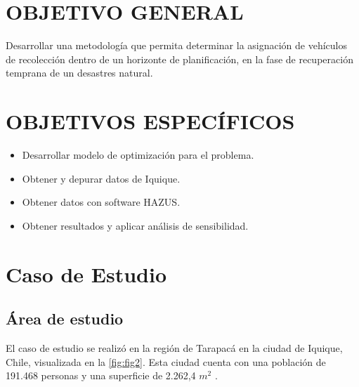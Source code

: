 \documentclass[12pt,a4paper]{article}
\begin{document}
\section{OBJETIVO GENERAL}

Desarrollar una metodología que permita determinar la asignación de vehículos de recolección dentro de un horizonte de planificación, en la fase de recuperación temprana de un desastres natural.

\section{OBJETIVOS ESPECÍFICOS}

\begin{itemize}
	\item Desarrollar modelo de optimización para el problema.
	\item Obtener y depurar datos de Iquique.
	\item Obtener datos con software HAZUS.
	\item Obtener resultados y aplicar análisis de sensibilidad.
\end{itemize}

\section{Caso de Estudio}

\subsection{Área de estudio}

El caso de estudio se realizó en la región de Tarapacá en la ciudad de Iquique, Chile, visualizada en la \ref{fig:fig2}. Esta ciudad cuenta con una población de 191.468 personas y una superficie de 2.262,4 $m^{2}$ \citep{CENSO2017}.
\end{document}
